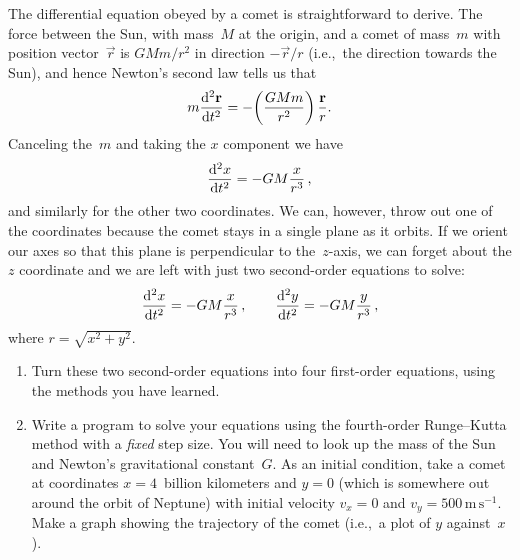 \documentclass[12pt]{article}
\begin{document}
\begin{exercises}
The differential equation obeyed by a comet is straightforward to
derive.  The force between the Sun, with mass~$M$ at the origin, and a
comet of mass~$m$ with position vector~$\vec{r}$ is $GMm/r^2$ in direction
$-\vec{r}/r$ (i.e.,~the direction towards the Sun), and hence Newton's
second law tells us that
\begin{displaymath}
m {\mathrm{d}^2\mathbf{r}\over\mathrm{d} t^2} = -\biggl({GMm\over r^2}\biggr)\,{\mathbf{r}\over r}.
\end{displaymath}
Canceling the~$m$ and taking the $x$ component we have
\begin{displaymath}
{\mathrm{d}^2 x\over\mathrm{d}t^2} = -GM {x\over r^3}\,,
\end{displaymath}
and similarly for the other two coordinates.  We can, however, throw out
one of the coordinates because the comet stays in a single plane as it
orbits.  If we orient our axes so that this plane is perpendicular to
the~$z$-axis, we can forget about the $z$ coordinate and we are left with
just two second-order equations to solve:
\begin{displaymath}
{\mathrm{d}^2 x\over\mathrm{d}t^2} = -GM {x\over r^3}\,, \qquad
{\mathrm{d}^2 y\over\mathrm{d}t^2} = -GM {y\over r^3}\,,
\end{displaymath}
where $r=\sqrt{x^2+y^2}$.

\begin{enumerate}\setlength{\itemsep}{0pt}
\item Turn these two second-order equations into four first-order
  equations, using the methods you have learned.
\item Write a program to solve your equations using the fourth-order
  Runge--Kutta method with a \emph{fixed} step size.  You will need to look
  up the mass of the Sun and Newton's gravitational constant~$G$.  As an
  initial condition, take a comet at coordinates $x=4$~billion kilometers
  and $y=0$ (which is somewhere out around the orbit of Neptune) with
  initial velocity $v_x=0$ and $v_y = 500\,\mathrm{m\,s}^{-1}$.  Make a
  graph showing the trajectory of the comet (i.e.,~a plot of $y$
  against~$x$).


\end{enumerate}
\end{exercises}
\end{document}

